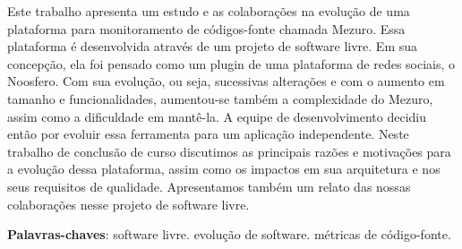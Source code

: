 \begin{resumo}

Este trabalho apresenta um estudo e as colaborações na evolução de uma plataforma para monitoramento de códigos-fonte chamada Mezuro. Essa plataforma é desenvolvida através de um projeto de software livre. Em sua concepção, ela foi pensado como um plugin de uma plataforma de redes sociais, o Noosfero.
%
Com sua evolução, ou seja, sucessivas alterações e com o aumento em tamanho e funcionalidades, aumentou-se também a complexidade do Mezuro, assim como a dificuldade em mantê-la. A equipe de desenvolvimento decidiu então por evoluir essa ferramenta para um aplicação independente.
%
Neste trabalho de conclusão de curso discutimos as principais razões e motivações para a evolução dessa plataforma, assim como os impactos em sua arquitetura e nos seus requisitos de qualidade.
%
Apresentamos também um relato das nossas colaborações nesse projeto de software livre.
 \vspace{\onelineskip}
    
 \noindent
 \textbf{Palavras-chaves}: software livre. evolução de software. métricas de código-fonte.
\end{resumo}
